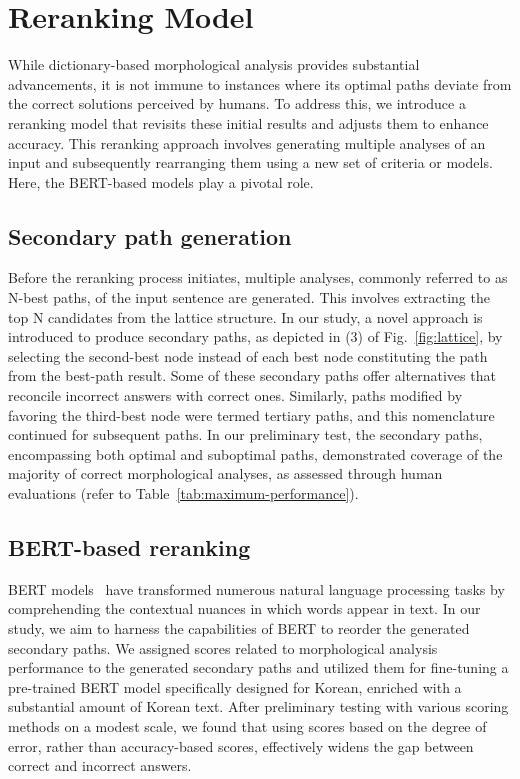 \documentclass[AMS,STIX2COL]{WileyNJD-v2}
\begin{document}
    \section{Reranking Model}\label{sec:reranking-model}

    While dictionary-based morphological analysis provides substantial advancements, it is not immune to instances where its optimal paths deviate from the correct solutions perceived by humans.
    To address this, we introduce a reranking model that revisits these initial results and adjusts them to enhance accuracy.
    This reranking approach involves generating multiple analyses of an input and subsequently rearranging them using a new set of criteria or models.
    Here, the BERT-based models play a pivotal role.

    \subsection{Secondary path generation}\label{subsec:secondary-path-generation}

    Before the reranking process initiates, multiple analyses, commonly referred to as N-best paths, of the input sentence are generated.
    This involves extracting the top N candidates from the lattice structure.
    In our study, a novel approach is introduced to produce secondary paths, as depicted in (3) of Fig.~\ref{fig:lattice}, by selecting the second-best node instead of each best node constituting the path from the best-path result.
    Some of these secondary paths offer alternatives that reconcile incorrect answers with correct ones.
    Similarly, paths modified by favoring the third-best node were termed tertiary paths, and this nomenclature continued for subsequent paths.
    In our preliminary test, the secondary paths, encompassing both optimal and suboptimal paths, demonstrated coverage of the majority of correct morphological analyses, as assessed through human evaluations (refer to Table~\ref{tab:maximum-performance}).

    \subsection{BERT-based reranking}\label{subsec:bert-based-reranking}

    BERT models~\cite{Devlin2019} have transformed numerous natural language processing tasks by comprehending the contextual nuances in which words appear in text.
    In our study, we aim to harness the capabilities of BERT to reorder the generated secondary paths.
    We assigned scores related to morphological analysis performance to the generated secondary paths and utilized them for fine-tuning a pre-trained BERT model specifically designed for Korean, enriched with a substantial amount of Korean text.
    After preliminary testing with various scoring methods on a modest scale, we found that using scores based on the degree of error, rather than accuracy-based scores, effectively widens the gap between correct and incorrect answers.
\end{document}

